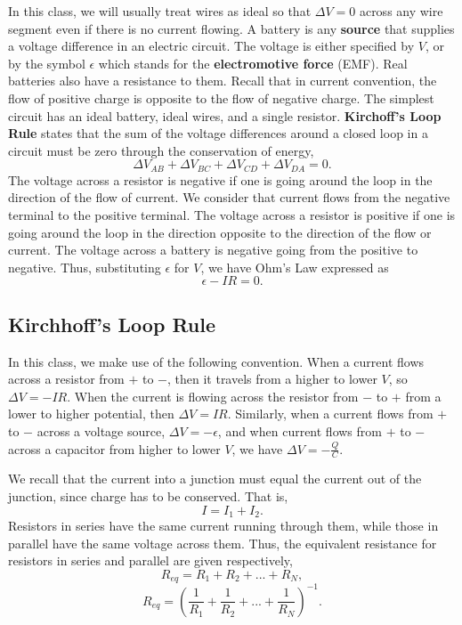\documentclass[11pt]{article}
\theoremstyle{plain} %
\theoremstyle{definition}
\theoremstyle{example}
\theoremstyle{remark}
\begin{document}
In this class, we will usually treat wires as ideal so that $\Delta V = 0$ across any wire segment even if there is no current flowing. A battery is any \textbf{source} that supplies a voltage difference in an electric circuit. The voltage is either specified by $V$, or by the symbol $\epsilon$ which stands for the \textbf{electromotive force} (EMF). Real batteries also have a resistance to them. Recall that in current convention, the flow of positive charge is opposite to the flow of negative charge. The simplest circuit has an ideal battery, ideal wires, and a single resistor. \textbf{Kirchoff's Loop Rule} states that the sum of the voltage differences around a closed loop in a circuit must be zero through the conservation of energy,
$$\Delta V_{AB} + \Delta V_{BC} + \Delta V_{CD} + \Delta V_{DA} =0.$$ The voltage across a resistor is negative if one is going around the loop in the direction of the flow of current. We consider that current flows from the negative terminal to the positive terminal. The voltage across a resistor is positive if one is going around the loop in the direction opposite to the direction of the flow or current. The voltage across a battery is negative going from the positive to negative. Thus, substituting $\epsilon$ for $V$, we have Ohm's Law expressed as 
$$\epsilon-IR = 0.$$

\subsection{Kirchhoff's Loop Rule}
In this class, we make use of the following convention. When a current flows across a resistor from $+$ to $-$, then it travels from a higher to lower $V$, so $\Delta V = -IR$. When the current is flowing across the resistor from $-$ to $+$ from a lower to higher potential, then $\Delta V = IR$. Similarly, when a current flows from $+$ to $-$ across a voltage source, $\Delta V = -\epsilon$, and when current flows from $+$ to $-$ across a capacitor from higher to lower $V$, we have $\Delta V = -\frac{Q}{C}$. 

We recall that the current into a junction must equal the current out of the junction, since charge has to be conserved. That is, 
$$I = I_1+I_2.$$
Resistors in series have the same current running through them, while those in parallel have the same voltage across them. Thus, the equivalent resistance for resistors in series and parallel are given respectively,
$$R_{eq} = R_1 + R_2 + ... + R_N,$$
$$R_{eq} = \left(\frac{1}{R_1} + \frac{1}{R_2} + ... + \frac{1}{R_N}\right)^{-1}.$$
\end{document}
